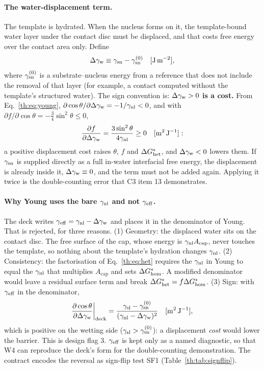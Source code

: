\paragraph{The water-displacement term.} The template is hydrated. When the nucleus forms on it,
the template-bound water layer under the contact disc must be displaced, and that costs free
energy over the contact area only. Define
\begin{equation}\label{th:eq:dgw}
\Delta\gamma_\mathrm{w}\equiv\gamma_\mathrm{sn}-\gamma_\mathrm{sn}^{(0)} \quad[\mathrm{J\,m^{-2}}],
\end{equation}
where $\gamma_\mathrm{sn}^{(0)}$ is a substrate--nucleus energy from a reference that does not include the removal
of that layer (for example, a contact computed without the template's structured water). The
sign convention is: \textbf{$\Delta\gamma_\mathrm{w}>0$ is a cost.} From Eq.~\eqref{th:eq:young},
$\partial\cos\theta/\partial\Delta\gamma_\mathrm{w}=-1/\gamma_\mathrm{nl}<0$, and with $\partial f/\partial\cos\theta=-\tfrac34\sin^{2}\theta\le0$,
\begin{equation}\label{th:eq:signflip}
\frac{\partial f}{\partial\Delta\gamma_\mathrm{w}}=\frac{3\sin^{2}\theta}{4\gamma_\mathrm{nl}}\ge0 \quad[\mathrm{m^{2}\,J^{-1}}]:
\end{equation}
a positive displacement cost raises $\theta$, $f$ and $\Delta G^{*}_\mathrm{het}$, and $\Delta\gamma_\mathrm{w}<0$ lowers them. If
$\gamma_\mathrm{sn}$ is supplied directly as a full in-water interfacial free energy, the displacement is
already inside it, $\Delta\gamma_\mathrm{w}\equiv0$, and the term must not be added again. Applying it twice is the
double-counting error that C3 item 13 demonstrates.

\paragraph{Why Young uses the bare $\gamma_\mathrm{nl}$ and not $\gamma_\mathrm{eff}$.} The deck writes
$\gamma_\mathrm{eff}=\gamma_\mathrm{nl}-\Delta\gamma_\mathrm{w}$ and places it in the denominator of Young. That is rejected, for three reasons.
(1) Geometry: the displaced water sits on the contact disc. The free surface of the cap, whose
energy is $\gamma_\mathrm{nl} A_\mathrm{cap}$, never touches the template, so nothing about the template's
hydration changes $\gamma_\mathrm{nl}$. (2) Consistency: the factorisation of Eq.~\eqref{th:eq:het} requires the
$\gamma_\mathrm{nl}$ in Young to equal the $\gamma_\mathrm{nl}$ that multiplies $A_\mathrm{cap}$ and sets $\Delta G^{*}_\mathrm{hom}$. A modified
denominator would leave a residual surface term and break $\Delta G^{*}_\mathrm{het}=f\Delta G^{*}_\mathrm{hom}$. (3) Sign: with
$\gamma_\mathrm{eff}$ in the denominator,
\begin{equation}\label{th:eq:deck-sign}
\frac{\partial\cos\theta}{\partial\Delta\gamma_\mathrm{w}}\bigg|_\mathrm{deck}=\frac{\gamma_\mathrm{sl}-\gamma_\mathrm{sn}^{(0)}}{(\gamma_\mathrm{nl}-\Delta\gamma_\mathrm{w})^{2}} \quad[\mathrm{m^{2}\,J^{-1}}],
\end{equation}
which is positive on the wetting side ($\gamma_\mathrm{sl}>\gamma_\mathrm{sn}^{(0)}$): a displacement \emph{cost} would lower the
barrier. This is design flag 3. $\gamma_\mathrm{eff}$ is kept only as a named diagnostic, so that W4 can
reproduce the deck's form for the double-counting demonstration. The contract encodes the
reversal as sign-flip test SF1 (Table~\ref{th:tab:signflip}).

